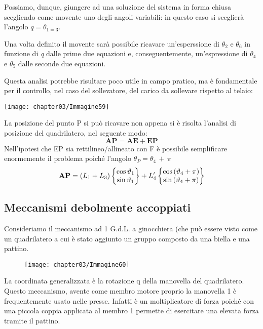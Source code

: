 		Possiamo, dunque, giungere ad una soluzione del sistema in forma chiusa scegliendo come movente uno degli angoli variabili: in questo caso si sceglierà l'angolo $q = \theta_{1=3}$.
		
		Una volta definito il movente sarà possibile ricavare un'esperssione di $\theta_2$ e $\theta_6$ in funzione di \emph{q} dalle prime due equazioni e, conseguentemente, un'espressione di $\theta_4$ e $\theta_5$ dalle seconde due equazioni.
		
		Questa analisi potrebbe risultare poco utile in campo pratico, ma è fondamentale per il controllo, nel caso del sollevatore, del carico da sollevare rispetto al telaio:
		
		\begin{minipage}{.5\textwidth}
		\centering
		\texttt{[image: chapter03/Immagine59]}
		\end{minipage}
		\hfill
		\begin{minipage}{.5\textwidth}
		La posizione del punto P si può ricavare non appena si è risolta l'analisi di posizione del quadrilatero, nel seguente modo:
		\[\mathbf{AP} = \mathbf{AE} + \mathbf{EP}\]
		Nell'ipotesi che EP sia rettilineo/allineato con F è possibile semplificare enormemente il problema poiché l'angolo $\theta_P = \theta_4 \,+\,\pi$
		\[\mathbf{AP} = (L_1 + L_3)\begin{Bmatrix}\cos{\vartheta_1}\\\sin{\vartheta_1}\end{Bmatrix}+L'_4\begin{Bmatrix}\cos{(\vartheta_4 + \pi)}\\\sin{(\vartheta_4 + \pi)}\end{Bmatrix}\]
		\end{minipage}
		
			\subsection{Meccanismi debolmente accoppiati}
		Consideriamo il meccanismo ad 1 G.d.L. a ginocchiera (che può essere visto come un quadrilatero a cui è stato aggiunto un gruppo composto da una biella e una pattino.
		
		
		\begin{figure}[!h]
		\begin{center}
		\texttt{[image: chapter03/Immagine60]}
		\end{center}
		\end{figure}
		
		
		La coordinata generalizzata è la rotazione q della manovella del quadrilatero. Questo meccanismo, avente come membro motore proprio la manovella 1 è frequentemente usato nelle presse. Infatti è un moltiplicatore di forza poiché con una piccola coppia applicata al membro 1 permette di esercitare una elevata forza tramite il pattino.
		
